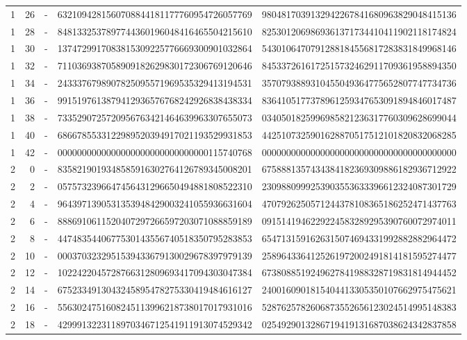 \begin{longtable}{rrrll}
1 & 26 & - & 6321094281560708844181177760954726057769 & 9804817039132942267841680963829048415136 \\
1 & 28 & - & 8481332537897744360196048416465504215610 & 8253012069869361371734410411902118174824 \\
1 & 30 & - & 1374729917083815309225776669300901032864 & 5430106470791288184556817283831849968146 \\
1 & 32 & - & 7110369387058909182629830172306769120646 & 8453372616172515732462911709361958894350 \\
1 & 34 & - & 2433376798907825095571969535329413194531 & 3570793889310455049364775652807747734736 \\
1 & 36 & - & 9915197613879412936576768242926838438334 & 8364105177378961259347653091894846017487 \\
1 & 38 & - & 7335290725720956763421464639963307655073 & 0340501825996985821236317760309628699044 \\
1 & 40 & - & 6866785533122989520394917021193529931853 & 4425107325901628870517512101820832068285 \\
1 & 42 & - & 0000000000000000000000000000000115740768 & 0000000000000000000000000000000000000000 \\
2 & 0 & - & 8358219019348585916302764126789345008201 & 6758881357434384182369309886182936712922 \\
2 & 2 & - & 0575732396647456431296650494881808522310 & 2309880999253903553633396612324087301729 \\
2 & 4 & - & 9643971390531353948429003241055936631604 & 4707926250571244378108365186252471437763 \\
2 & 6 & - & 8886910611520407297266597203071088859189 & 0915141946229224583289295390760072974011 \\
2 & 8 & - & 4474835440677530143556740518350795283853 & 6547131591626315074694331992882882964472 \\
2 & 10 & - & 0003703232951539433679130029678397979139 & 2589643364125261972002491814181595274477 \\
2 & 12 & - & 1022422045728766312809693417094303047384 & 6738088519249627841988328719831814944452 \\
2 & 14 & - & 6752334913043245895478275330419484616127 & 2400160901815404413305350107662975475621 \\
2 & 16 & - & 5563024751608245113996218738017017931016 & 5287625782606873552656123024514995148383 \\
2 & 18 & - & 4299913223118970346712541911913074529342 & 0254929013286719419131687038624342837858 \\

\end{longtable}
